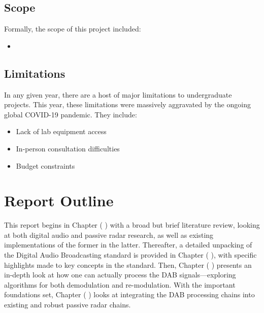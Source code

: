\documentclass[class=report,11pt,crop=false]{standalone}
\begin{document}
\subsection{Scope}
Formally, the scope of this project included:
\begin{itemize}
    \item 
\end{itemize}

\subsection{Limitations}
In any given year, there are a host of major limitations to undergraduate projects. This year, these limitations were massively aggravated by the ongoing global COVID-19 pandemic. They include:
\begin{itemize}
    \item Lack of lab equipment access
    \item In-person consultation difficulties
    \item Budget constraints
\end{itemize}


\section{Report Outline}
This report begins in Chapter ( ) with a broad but brief literature review, looking at both digital audio and passive radar research, as well as existing implementations of the former in the latter. Thereafter, a detailed unpacking of the Digital Audio Broadcasting standard is provided in Chapter ( ), with specific highlights made to key concepts in the standard. Then, Chapter ( ) presents an in-depth look at how one can actually process the DAB signals---exploring algorithms for both demodulation and re-modulation. With the important foundations set, Chapter ( ) looks at integrating the DAB processing chains into existing and robust passive radar chains.


\blindtext










\ifstandalone

\fi
\end{document}
